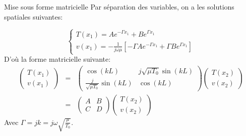 \documentclass[xcolor=x11names,compress]{beamer}
\renewcommand{\(}{\begin{columns}}
\renewcommand{\)}{\end{columns}}
\newcommand{\<}[1]{\begin{column}{#1}}
\renewcommand{\>}{\end{column}}
\begin{document}

\begin{frame}{Mise sous forme matricielle}
Par séparation des variables, on a les solutions spatiales suivantes:

\begin{equation}
\begin{cases}
T(x_1)  =  A e^{-\Gamma x_1} + B e^{\Gamma x_1} \\
v(x_1)  =  -\frac{1}{j\omega\mu} [ -\Gamma A e^{-\Gamma x_1} + \Gamma B e^{\Gamma x_1}]
\end{cases}
\end{equation}
D'où la forme matricielle suivante:
\begin{eqnarray}
\begin{pmatrix} T(x_1) \\ v(x_1) \end{pmatrix} & = & \begin{pmatrix} \cos(k L) & j \sqrt{\mu T_0} \sin(k L) \\ \frac{j}{\sqrt{\mu T_0}} \sin(k L) & \cos(k L) \end{pmatrix} \begin{pmatrix} T(x_2)\\ v(x_2) \end{pmatrix} \\
& = & \begin{pmatrix} A & B \\ C & D \end{pmatrix} \begin{pmatrix} T(x_2)\\ v(x_2) \end{pmatrix}
\end{eqnarray}
Avec $\Gamma = jk = j\omega\sqrt{\frac{\mu}{T_0}}$.
\end{frame}
\end{document}
